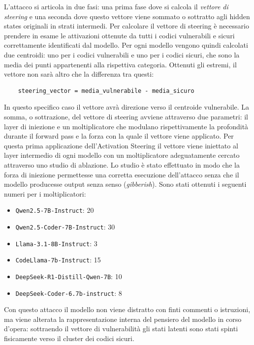 L'attacco si articola in due fasi: una prima fase dove si calcola il \textit{vettore di steering} e una seconda dove questo vettore viene sommato o sottratto agli hidden states originali in strati intermedi.
Per calcolare il vettore di steering è necessario prendere in esame le attivazioni ottenute da tutti i codici vulnerabili e sicuri correttamente identificati dal modello. Per ogni modello vengono quindi calcolati due centroidi: uno per i codici vulnerabili e uno per i codici sicuri, che sono la media dei punti appartenenti alla rispettiva categoria.
Ottenuti gli estremi, il vettore non sarà altro che la differenza tra questi:

\begin{verbatim}
    steering_vector = media_vulnerabile - media_sicuro
\end{verbatim}

In questo specifico caso il vettore avrà direzione verso il centroide vulnerabile.
La somma, o sottrazione, del vettore di steering avviene attraverso due parametri: il layer di iniezione e un moltiplicatore che modulano rispettivamente la profondità durante il forward pass e la forza con la quale il vettore viene applicato.
Per questa prima applicazione dell'Activation Steering il vettore viene iniettato al layer intermedio di ogni modello con un moltiplicatore adeguatamente cercato attraverso uno studio di ablazione. Lo studio è stato effettuato in modo che la forza di iniezione permettesse una corretta esecuzione dell'attacco senza che il modello producesse output senza senso (\textit{gibberish}). Sono stati ottenuti i seguenti numeri per i moltiplicatori:

\begin{itemize}[noitemsep]
    \item \texttt{Qwen2.5-7B-Instruct}: 20
    \item \texttt{Qwen2.5-Coder-7B-Instruct}: 30
    \item \texttt{Llama-3.1-8B-Instruct}: 3
    \item \texttt{CodeLlama-7b-Instruct}: 15
    \item \texttt{DeepSeek-R1-Distill-Qwen-7B}: 10
    \item \texttt{DeepSeek-Coder-6.7b-instruct}: 8
\end{itemize}

Con questo attacco il modello non viene distratto con finti commenti o istruzioni, ma viene alterata la rappresentazione interna del pensiero del modello in corso d'opera: sottraendo il vettore di vulnerabilità gli stati latenti sono stati spinti fisicamente verso il cluster dei codici sicuri.


